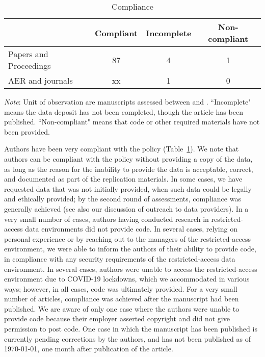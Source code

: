 \documentclass[PP]{AEA}
\begin{document}
\begin{table}[t]
    \centering
    \caption{Compliance}
    \label{tab:compliance}
    \begin{threeparttable}
    \begin{tabular}{lccc}
    \toprule
         & Compliant & Incomplete & Non-compliant \\
    \midrule
    Papers and Proceedings &  87    &  4 & 1\\
    AER and journals       & xx    &  1  & 0\\
    \bottomrule
    \end{tabular}
    \begin{tablenotes}
    \footnotesize
    \item[] \textit{Note}: Unit of observation are manuscripts assessed between \firstday{} and \lastday{}. ``Incomplete" means the data deposit has not been completed, though the article has been published. ``Non-compliant" means that code or other required materials have not been provided.
    \end{tablenotes}
    \end{threeparttable}
\end{table}


Authors have been very compliant with the policy (Table~\ref{tab:compliance}). We note that authors can be compliant with the policy without providing a copy of the data, as long as the reason for the inability to provide the data is acceptable, correct, and documented as part of the replication materials. In some cases, we have requested data that was not initially provided, when such data could be legally and ethically provided; by the second round of assessments, compliance was generally achieved (see also our discussion of outreach to data providers). In a very small number of cases, authors having conducted research in restricted-access data environments did not provide code. In several cases, relying on personal experience or by reaching out to the managers of the restricted-access environment, we were able to inform the authors of their ability to provide code, in compliance with any security requirements of the restricted-access data environment. In several cases, authors were unable to access the restricted-access environment due to COVID-19 lockdowns, which we accommodated in various ways; however, in all cases, code was ultimately provided. For a very small number of articles, compliance was achieved after the manuscript had been published. We are aware of only one case where the authors were unable to provide code because their employer asserted copyright and did not give permission to post code. One case in which the manuscript has been published is currently pending corrections by the authors, and has not been published as of \today, one month after publication of the article.
\end{document}
